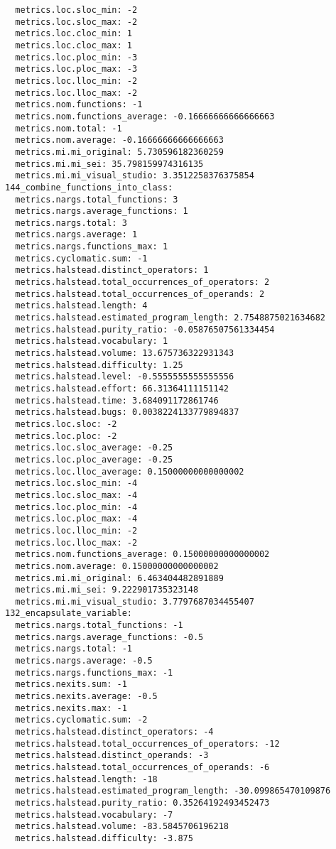 \begin{verbatim}
  metrics.loc.sloc_min: -2
  metrics.loc.sloc_max: -2
  metrics.loc.cloc_min: 1
  metrics.loc.cloc_max: 1
  metrics.loc.ploc_min: -3
  metrics.loc.ploc_max: -3
  metrics.loc.lloc_min: -2
  metrics.loc.lloc_max: -2
  metrics.nom.functions: -1
  metrics.nom.functions_average: -0.16666666666666663
  metrics.nom.total: -1
  metrics.nom.average: -0.16666666666666663
  metrics.mi.mi_original: 5.730596182360259
  metrics.mi.mi_sei: 35.798159974316135
  metrics.mi.mi_visual_studio: 3.3512258376375854
144_combine_functions_into_class:
  metrics.nargs.total_functions: 3
  metrics.nargs.average_functions: 1
  metrics.nargs.total: 3
  metrics.nargs.average: 1
  metrics.nargs.functions_max: 1
  metrics.cyclomatic.sum: -1
  metrics.halstead.distinct_operators: 1
  metrics.halstead.total_occurrences_of_operators: 2
  metrics.halstead.total_occurrences_of_operands: 2
  metrics.halstead.length: 4
  metrics.halstead.estimated_program_length: 2.7548875021634682
  metrics.halstead.purity_ratio: -0.05876507561334454
  metrics.halstead.vocabulary: 1
  metrics.halstead.volume: 13.675736322931343
  metrics.halstead.difficulty: 1.25
  metrics.halstead.level: -0.5555555555555556
  metrics.halstead.effort: 66.31364111151142
  metrics.halstead.time: 3.684091172861746
  metrics.halstead.bugs: 0.0038224133779894837
  metrics.loc.sloc: -2
  metrics.loc.ploc: -2
  metrics.loc.sloc_average: -0.25
  metrics.loc.ploc_average: -0.25
  metrics.loc.lloc_average: 0.15000000000000002
  metrics.loc.sloc_min: -4
  metrics.loc.sloc_max: -4
  metrics.loc.ploc_min: -4
  metrics.loc.ploc_max: -4
  metrics.loc.lloc_min: -2
  metrics.loc.lloc_max: -2
  metrics.nom.functions_average: 0.15000000000000002
  metrics.nom.average: 0.15000000000000002
  metrics.mi.mi_original: 6.463404482891889
  metrics.mi.mi_sei: 9.222901735323148
  metrics.mi.mi_visual_studio: 3.7797687034455407
132_encapsulate_variable:
  metrics.nargs.total_functions: -1
  metrics.nargs.average_functions: -0.5
  metrics.nargs.total: -1
  metrics.nargs.average: -0.5
  metrics.nargs.functions_max: -1
  metrics.nexits.sum: -1
  metrics.nexits.average: -0.5
  metrics.nexits.max: -1
  metrics.cyclomatic.sum: -2
  metrics.halstead.distinct_operators: -4
  metrics.halstead.total_occurrences_of_operators: -12
  metrics.halstead.distinct_operands: -3
  metrics.halstead.total_occurrences_of_operands: -6
  metrics.halstead.length: -18
  metrics.halstead.estimated_program_length: -30.099865470109876
  metrics.halstead.purity_ratio: 0.35264192493452473
  metrics.halstead.vocabulary: -7
  metrics.halstead.volume: -83.5845706196218
  metrics.halstead.difficulty: -3.875

\end{verbatim}
